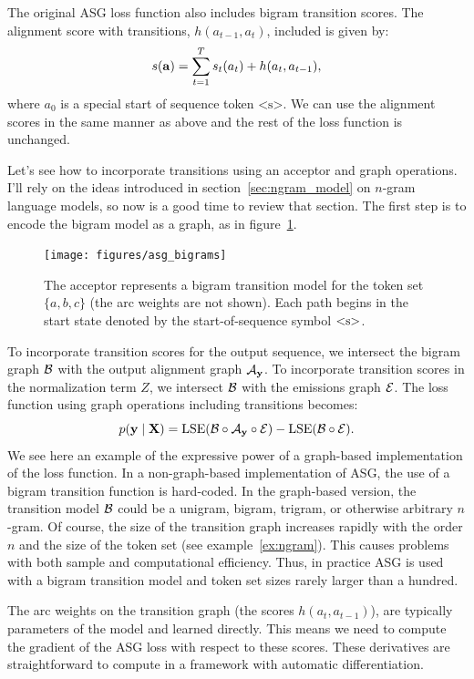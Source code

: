 The original ASG loss function also includes bigram transition scores. The
alignment score with transitions, $h(a_{t-1}, a_t)$, included is given by:
$$
s({\bf a}) = \sum_{t=1}^T s_t(a_t) + h(a_t, a_{t-1}),
$$
where $a_0$ is a special start of sequence token $\textrm{<s>}$. We can use the
alignment scores in the same manner as above and the rest of the loss function
is unchanged.

Let's see how to incorporate transitions using an acceptor and graph
operations. I'll rely on the ideas introduced in section~\ref{sec:ngram_model}
on $n$-gram language models, so now is a good time to review that section. The
first step is to encode the bigram model as a graph, as in
figure~\ref{fig:asg_bigrams}.

\begin{figure}
    \centering
    \texttt{[image: figures/asg\_bigrams]}
    \caption{The acceptor represents a bigram transition model for the token
    set $\{a, b, c\}$ (the arc weights are not shown). Each path begins in the
    start state denoted by the start-of-sequence symbol $\textrm{\textless s\textgreater}$.}
    \label{fig:asg_bigrams}
\end{figure}

To incorporate transition scores for the output sequence, we intersect the
bigram graph $\mathcal{B}$ with the output alignment graph $\mathcal{A}_{\bf y}$. To incorporate
transition scores in the normalization term $Z$, we intersect $\mathcal{B}$ with the
emissions graph $\mathcal{E}$. The loss function using graph operations including
transitions becomes:
$$
p({\bf y} \mid {\bf X}) = \operatorname*{\textrm{LSE}}(\mathcal{B} \circ \mathcal{A}_{\bf y} \circ \mathcal{E}) - \operatorname*{\textrm{LSE}}(\mathcal{B} \circ \mathcal{E}).
$$
We see here an example of the expressive power of a graph-based implementation
of the loss function. In a non-graph-based implementation of ASG, the use of a
bigram transition function is hard-coded. In the graph-based version, the
transition model $\mathcal{B}$ could be a unigram, bigram, trigram, or otherwise
arbitrary $n$-gram. Of course, the size of the transition graph increases
rapidly with the order $n$ and the size of the token set (see
example~\ref{ex:ngram}). This causes problems with both sample and
computational efficiency. Thus, in practice ASG is used with a bigram
transition model and token set sizes rarely larger than a hundred.

The arc weights on the transition graph (the scores $h(a_t, a_{t-1})$), are
typically parameters of the model and learned directly. This means we need to
compute the gradient of the ASG loss with respect to these scores. These
derivatives are straightforward to compute in a framework with automatic
differentiation.

